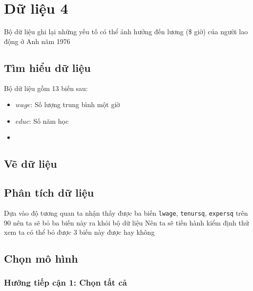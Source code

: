 
\section{Dữ liệu 4}
Bộ dữ liệu ghi lại những yếu tố có thể ảnh hưởng đến lương (\$ giờ) của người lao động ở Anh năm 1976

\subsection*{Tìm hiểu dữ liệu}
Bộ dữ liệu gồm 13 biến sau:
\begin{itemize}
	\item $wage$: Số lượng trung bình một giờ
	\item $educ$: Số năm học
	\item 
\end{itemize}

\subsection*{Vẽ dữ liệu}

\subsection*{Phân tích dữ liệu}

Dựa vào độ tương quan ta nhận thấy được ba biến \texttt{lwage}, \texttt{tenursq}, \texttt{expersq} trên 90 nên ta sẽ bỏ ba biến này ra khỏi bộ dữ liệu
Nên ta sẽ tiến hành kiểm định thử xem ta có thể bỏ được 3 biến này được hay không

\subsection*{Chọn mô hình}
\subsubsection*{Hướng tiếp cận 1: Chọn tất cả}

